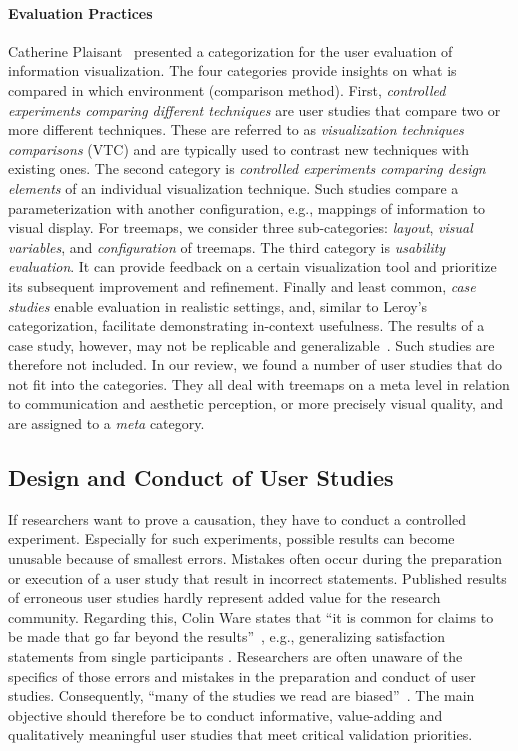 \documentclass[sigconf,
natbib=true]{acmart}
\begin{document}
\paragraph{\textbf{Evaluation Practices}} %
Catherine Plaisant~\cite{plaisant2004-evaluation} presented a categorization for the user evaluation of information visualization.
The four categories provide insights on what is compared in which environment (comparison method).
First, \emph{controlled experiments comparing different techniques} are user studies that compare two or more different techniques.
These are referred to as \emph{visualization techniques comparisons} (VTC) and are typically used to contrast new techniques with existing ones.
The second category is \emph{controlled experiments comparing design elements} of an individual visualization technique.
Such studies compare a parameterization with another configuration, e.g., mappings of information to visual display.
For treemaps, we consider three sub-categories: \emph{layout}, \emph{visual variables}, and \emph{configuration} of treemaps.
The third category is \emph{usability evaluation}. 
It can provide feedback on a certain visualization tool and prioritize its subsequent improvement and refinement.
Finally and least common, \emph{case studies} enable evaluation in realistic settings, and, similar to Leroy's categorization, facilitate demonstrating in-context usefulness.
The results of a case study, however, may not be replicable and generalizable~\cite{plaisant2004-evaluation}. Such studies are therefore not included.
In our review, we found a number of user studies that do not fit into the categories.
They all deal with treemaps on a meta level in relation to communication and aesthetic perception, or more precisely visual quality, and are assigned to a \emph{meta} category.

\subsection{Design and Conduct of User Studies}%
If researchers want to prove a causation, they have to conduct a controlled experiment. 
Especially for such experiments, possible results can become unusable because of smallest errors.
Mistakes often occur during the preparation or execution of a user study that result in incorrect statements.
Published results of erroneous user studies hardly represent added value for the research community. %
Regarding this, Colin Ware states that \enquote{it is common for claims to be made that go far beyond the results}~\cite{ware2013-infovis}, e.g., generalizing satisfaction statements from single participants \cite{isenberg2013-review}.
Researchers are often unaware of the specifics of those errors and mistakes in the preparation and conduct of user studies. %
Consequently, \enquote{many of the studies we read are biased}~\cite{ware2013-infovis}.
The main objective should therefore be to conduct informative, value-adding and qualitatively meaningful user studies that meet critical validation priorities.
\end{document}
